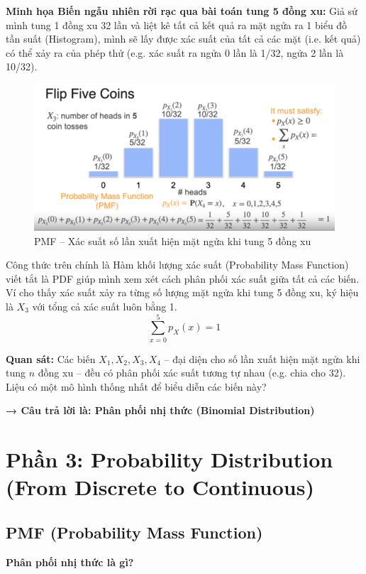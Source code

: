 \documentclass[11pt]{article}
\begin{document}
\textbf{Minh họa Biến ngẫu nhiên rời rạc qua bài toán tung 5 đồng xu:}
Giả sử mình tung 1 đồng xu 32 lần và liệt kê tất cả kết quả ra mặt ngửa ra 1 biểu đồ tần suất (Histogram), mình sẽ lấy được xác suất của tất cả các mặt (i.e. kết quả) có thể xảy ra của phép thử  (e.g. xác suất ra ngửa 0 lần là 1/32, ngửa 2 lần là 10/32).\\ 


\begin{figure}[H]
    \centering
    \includegraphics[width=0.85\linewidth]{images/coin_flip.png}
    \caption{PMF – Xác suất số lần xuất hiện mặt ngửa khi tung 5 đồng xu}
\end{figure}

Công thức trên chính là Hàm khối lượng xác suất (Probability Mass Function) viết tắt là PDF giúp mình xem xét cách phân phối xác suất giữa tất cả các biến.  Ví  cho thấy  xác suất xảy ra từng số lượng mặt ngửa khi tung 5 đồng xu, ký hiệu là $X_3$ với tổng cả xác suất luôn bằng 1.
\[
\sum_{x=0}^{5} p_X(x) = 1
\]


\textbf{Quan sát:} Các biến $X_1, X_2, X_3, X_4$ – đại diện cho số lần xuất hiện mặt ngửa khi tung $n$ đồng xu – đều có phân phối xác suất tương tự nhau (e.g.  chia cho 32). Liệu có một mô hình thống nhất để biểu diễn các biến này?

\begin{center}
    \textbf{→ Câu trả lời là: Phân phối nhị thức (Binomial Distribution)}
\end{center}

\vspace{1em}


\section{Phần 3: Probability Distribution (From Discrete to Continuous)}
\subsection{PMF (Probability Mass Function)}
\textbf{Phân phối nhị thức là gì?} \\
\end{document}
